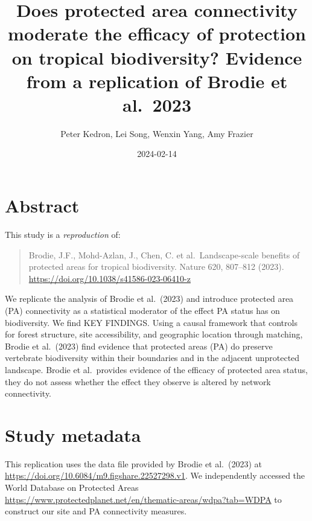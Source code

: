 \documentclass[
]{article}
\title{Does protected area connectivity moderate the efficacy of
protection on tropical biodiversity? Evidence from a replication of
Brodie et al.~2023}
\author{Peter Kedron, Lei Song, Wenxin Yang, Amy Frazier}
\date{2024-02-14}
\begin{document}
\maketitle

\hypertarget{abstract}{%
\section*{Abstract}\label{abstract}}

This study is a \emph{reproduction} of:

\begin{quote}
Brodie, J.F., Mohd-Azlan, J., Chen, C. et al.~Landscape-scale benefits
of protected areas for tropical biodiversity. Nature 620, 807--812
(2023). \url{https://doi.org/10.1038/s41586-023-06410-z}
\end{quote}

We replicate the analysis of Brodie et al.~(2023) and introduce
protected area (PA) connectivity as a statistical moderator of the
effect PA status has on biodiversity. We find KEY FINDINGS. Using a
causal framework that controls for forest structure, site accessibility,
and geographic location through matching, Brodie et al.~(2023) find
evidence that protected areas (PA) do preserve vertebrate biodiversity
within their boundaries and in the adjacent unprotected landscape.
Brodie et al.~provides evidence of the efficacy of protected area
status, they do not assess whether the effect they observe is altered by
network connectivity.

\hypertarget{study-metadata}{%
\section{Study metadata}\label{study-metadata}}

This replication uses the data file provided by Brodie et al.~(2023) at
\url{https://doi.org/10.6084/m9.figshare.22527298.v1}. We independently
accessed the World Database on Protected Areas
\url{https://www.protectedplanet.net/en/thematic-areas/wdpa?tab=WDPA} to
construct our site and PA connectivity measures.
\end{document}
